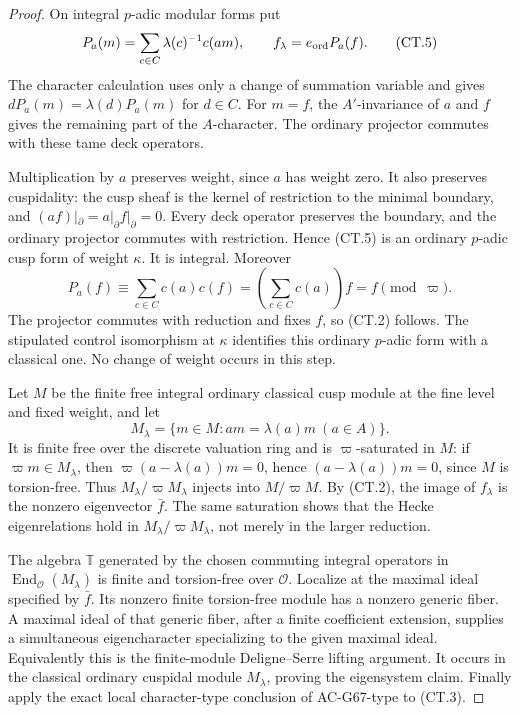 \begin{proof}
On integral $p$-adic modular forms put
\[
 P_a(m)=\sum_{c\in C}\lambda(c)^{-1}c(a m),
                        \qquad f_\lambda=e_{\rm ord}P_a(f).
                                                        \tag{CT.5}
\]
The character calculation uses only a change of summation
variable and gives $dP_a(m)=\lambda(d)P_a(m)$ for $d\in C$.
For $m=f$, the $A'$-invariance of $a$ and $f$ gives the
remaining part of the $A$-character.  The ordinary projector
commutes with these tame deck operators.

Multiplication by $a$ preserves weight, since $a$ has weight
zero.  It also preserves cuspidality: the cusp sheaf is the
kernel of restriction to the minimal boundary, and
$(a f)|_\partial=a|_\partial f|_\partial=0$.
Every deck operator preserves the boundary, and the
ordinary projector commutes with restriction.  Hence (CT.5)
is an ordinary $p$-adic cusp form of weight $\kappa$.
It is integral.  Moreover
\[
 P_a(f)\equiv\sum_{c\in C}c(a)c(f)
                =\left(\sum_{c\in C}c(a)\right)f=f
                       \pmod\varpi.                     \tag{CT.6}
\]
The projector commutes with reduction and fixes $f$, so
(CT.2) follows.  The stipulated control isomorphism at
$\kappa$ identifies this ordinary $p$-adic form with a
classical one.  No change of weight occurs in this step.

Let $M$ be the finite free integral ordinary classical cusp
module at the fine level and fixed weight, and let
\[
             M_\lambda=\{m\in M:a m=\lambda(a)m
                                             \ (a\in A)\}.
\]
It is finite free over the discrete valuation ring and is
$\varpi$-saturated in $M$: if $\varpi m\in M_\lambda$,
then $\varpi(a-\lambda(a))m=0$, hence
$(a-\lambda(a))m=0$, since $M$ is torsion-free.  Thus
$M_\lambda/\varpi M_\lambda$ injects into $M/\varpi M$.
By (CT.2), the image of $f_\lambda$ is the nonzero
eigenvector $\bar f$.  The same saturation shows that the
Hecke eigenrelations hold in $M_\lambda/\varpi M_\lambda$,
not merely in the larger reduction.

The algebra $\mathbb T$ generated by the chosen commuting
integral operators in $\operatorname{End}_{\mathcal O}
(M_\lambda)$ is finite and torsion-free over $\mathcal O$.
Localize at the maximal ideal specified by $\bar f$.
Its nonzero finite torsion-free module has a nonzero generic
fiber.  A maximal ideal of that generic fiber, after a
finite coefficient extension, supplies a simultaneous
eigencharacter specializing to the given maximal ideal.
Equivalently this is the finite-module Deligne--Serre
lifting argument.  It occurs in the classical ordinary
cuspidal module $M_\lambda$, proving the eigensystem claim.
Finally apply the exact local character-type conclusion
of AC-G67-type to (CT.3).
\end{proof}

